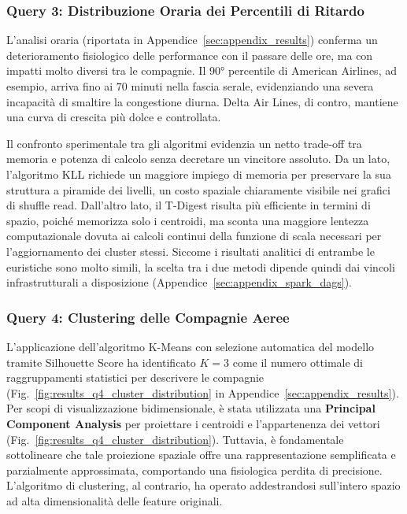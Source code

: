 \documentclass[conference]{IEEEtran}
\begin{document}
\subsubsection{Query 3: Distribuzione Oraria dei Percentili di Ritardo}
L'analisi oraria (riportata in Appendice~\ref{sec:appendix_results}) conferma un deterioramento fisiologico delle performance con il passare delle ore, ma con impatti molto diversi tra le compagnie.
Il 90° percentile di American Airlines, ad esempio, arriva fino ai $70$ minuti nella fascia serale, evidenziando una severa incapacità di smaltire la congestione diurna.
Delta Air Lines, di contro, mantiene una curva di crescita più dolce e controllata.

Il confronto sperimentale tra gli algoritmi evidenzia un netto trade-off tra memoria e potenza di calcolo senza decretare un vincitore assoluto. Da un lato, l'algoritmo KLL richiede un maggiore impiego di memoria per preservare la sua struttura a piramide dei livelli, un costo spaziale chiaramente visibile nei grafici di shuffle read. Dall'altro lato, il T-Digest risulta più efficiente in termini di spazio, poiché memorizza solo i centroidi, ma sconta una maggiore lentezza computazionale dovuta ai calcoli continui della funzione di scala necessari per l'aggiornamento dei cluster stessi. Siccome i risultati analitici di entrambe le euristiche sono molto simili, la scelta tra i due metodi dipende quindi dai vincoli infrastrutturali a disposizione (Appendice~\ref{sec:appendix_spark_dags}).
\subsubsection{Query 4: Clustering delle Compagnie Aeree}
L'applicazione dell'algoritmo K-Means con selezione automatica del modello tramite Silhouette Score ha identificato $K=3$ come il numero ottimale di raggruppamenti statistici per descrivere le compagnie (Fig.~\ref{fig:results_q4_cluster_distribution} in Appendice~\ref{sec:appendix_results}).
Per scopi di visualizzazione bidimensionale, è stata utilizzata una \textbf{Principal Component Analysis} per proiettare i centroidi e l'appartenenza dei vettori (Fig.~\ref{fig:results_q4_cluster_distribution}). Tuttavia, è fondamentale sottolineare che tale proiezione spaziale offre una rappresentazione semplificata e parzialmente approssimata, comportando una fisiologica perdita di precisione.
L'algoritmo di clustering, al contrario, ha operato addestrandosi sull'intero spazio ad alta dimensionalità delle feature originali.
\end{document}
